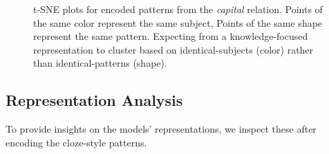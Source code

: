 \begin{figure}[t!]
\centering

{}


\caption{t-SNE plots for encoded patterns from the \textit{capital} relation. Points of the same color represent the same subject, Points of the same shape represent the same pattern. Expecting from a knowledge-focused representation to cluster based on identical-subjects (color) rather than identical-patterns (shape).}
\label{fig:tsne-emb}

\end{figure}

\subsection{Representation Analysis}


To provide insights on the models' representations, we inspect these after encoding the cloze-style patterns.

